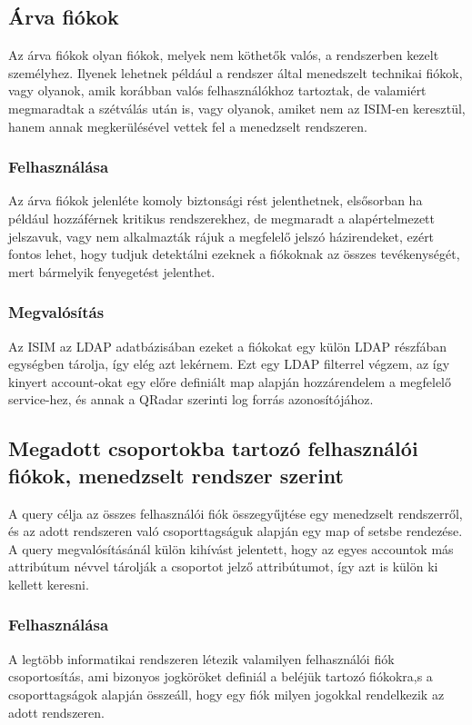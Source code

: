 \subsection{Árva fiókok } \label{lbl:orphanaccs}
Az árva fiókok olyan fiókok, melyek nem köthetők valós, a rendszerben kezelt személyhez. Ilyenek lehetnek például a rendszer által menedszelt technikai fiókok, vagy olyanok, amik korábban valós felhasználókhoz tartoztak, de valamiért megmaradtak a szétválás után is, vagy olyanok, amiket nem az ISIM-en keresztül, hanem annak megkerülésével vettek fel a menedzselt rendszeren. 
	\subsubsection{Felhasználása}
 	Az árva fiókok jelenléte komoly biztonsági rést jelenthetnek, elsősorban ha például hozzáférnek kritikus rendszerekhez, de megmaradt a alapértelmezett jelszavuk, vagy nem alkalmazták rájuk a megfelelő jelszó házirendeket, ezért fontos lehet, hogy tudjuk detektálni ezeknek a fiókoknak az összes tevékenységét, mert bármelyik fenyegetést jelenthet.
	\subsubsection{Megvalósítás}
	Az ISIM az LDAP adatbázisában ezeket a fiókokat egy külön LDAP részfában egységben tárolja, így elég azt lekérnem. Ezt egy LDAP filterrel végzem, az így kinyert account-okat egy előre definiált map alapján hozzárendelem a megfelelő service-hez, és annak a QRadar szerinti log forrás azonosítójához.
	
\subsection{Megadott csoportokba tartozó felhasználói fiókok, menedzselt rendszer szerint}		
A query célja az összes felhasználói fiók összegyűjtése egy menedzselt rendszerről, és az adott rendszeren való csoporttagságuk alapján egy map of setsbe rendezése. A query megvalósításánál külön kihívást jelentett, hogy az egyes accountok más attribútum névvel tárolják a csoportot jelző attribútumot, így azt is külön ki kellett keresni.
	\subsubsection{Felhasználása}
		A legtöbb informatikai rendszeren létezik valamilyen felhasználói fiók csoportosítás, ami bizonyos jogköröket definiál a beléjük tartozó fiókokra,s a csoporttagságok alapján összeáll, hogy egy fiók milyen jogokkal rendelkezik az adott rendszeren. 
		
